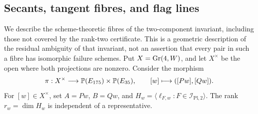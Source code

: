 \subsection{Secants, tangent fibres, and flag lines}
\label{sec:exceptional-reconstruction-fibres}

We describe the scheme-theoretic fibres of the two-component invariant,
including those not covered by the rank-two certificate.  This is a
geometric description of the residual ambiguity of that invariant,
not an assertion that every pair in such a fibre has isomorphic
failure schemes.
Put \(X=\operatorname{Gr}(4,W)\), and let \(X^\times\) be the open where
both projections are nonzero.  Consider the morphism
\[
 \pi:X^\times\longrightarrow\mathbb P(E_{175})\times\mathbb P(E_{35}),
       \qquad [w]\longmapsto([Pw],[Qw]).
\]
For \([w]\in X^\times\), set \(A=Pw\), \(B=Qw\), and
\(H_w=\langle\ell_{F,w}:F\in\mathcal I_{\mathrm{Pl},2}\rangle\).
The rank \(r_w=\dim H_w\) is independent of a representative.

